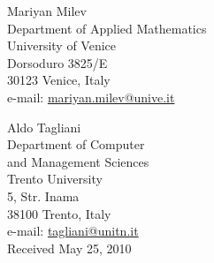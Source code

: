 \documentclass[10pt]{article}
\begin{document}
Mariyan Milev\\
Department of Applied Mathematics\\
University of Venice\\
Dorsoduro 3825/E\\
30123 Venice, Italy\\
e-mail: \href{mailto:mariyan.milev@unive.it}{mariyan.milev@unive.it}

Aldo Tagliani\\
Department of Computer\\
and Management Sciences\\
Trento University\\
5, Str. Inama\\
38100 Trento, Italy\\
e-mail: \href{mailto:tagliani@unitn.it}{tagliani@unitn.it}\\
Received May 25, 2010
\end{document}
